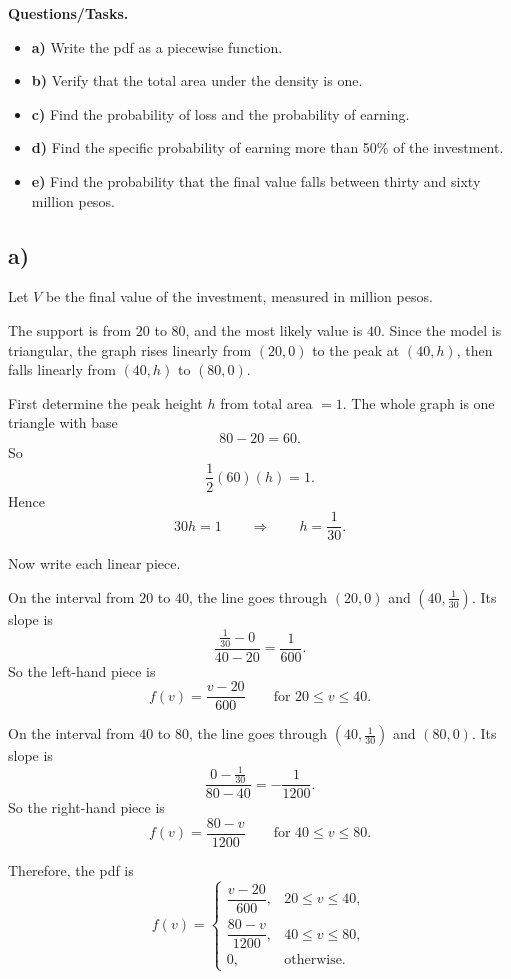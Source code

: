 \textbf{Questions/Tasks.}
\begin{itemize}
	\item \textbf{a)} Write the pdf as a piecewise function.
	\item \textbf{b)} Verify that the total area under the density is one.
	\item \textbf{c)} Find the probability of loss and the probability of earning.
	\item \textbf{d)} Find the specific probability of earning more than 50\% of the investment.
\item \textbf{e)} Find the probability that the final value falls between thirty and sixty million pesos.
\end{itemize}

\subsection*{a)}
Let $V$ be the final value of the investment, measured in million pesos.

The support is from $20$ to $80$, and the most likely value is $40$. Since the model is triangular, the graph rises linearly from $(20,0)$ to the peak at $(40,h)$, then falls linearly from $(40,h)$ to $(80,0)$.

First determine the peak height $h$ from total area $=1$. The whole graph is one triangle with base
\[
80-20=60.
\]
So
\[
\frac12(60)(h)=1.
\]
Hence
\[
30h=1
\qquad \Rightarrow \qquad
h=\frac{1}{30}.
\]

Now write each linear piece.

On the interval from $20$ to $40$, the line goes through $(20,0)$ and $(40,\tfrac{1}{30})$. Its slope is
\[
\frac{\tfrac{1}{30}-0}{40-20}=\frac{1}{600}.
\]
So the left-hand piece is
\[
f(v)=\frac{v-20}{600}\qquad \text{for }20\le v\le 40.
\]

On the interval from $40$ to $80$, the line goes through $(40,\tfrac{1}{30})$ and $(80,0)$. Its slope is
\[
\frac{0-\tfrac{1}{30}}{80-40}=-\frac{1}{1200}.
\]
So the right-hand piece is
\[
f(v)=\frac{80-v}{1200}\qquad \text{for }40\le v\le 80.
\]

Therefore, the pdf is
\[
f(v)=
\begin{cases}
	\dfrac{v-20}{600}, & 20\le v\le 40,\\[6pt]
	\dfrac{80-v}{1200}, & 40\le v\le 80,\\[6pt]
	0, & \text{otherwise.}
\end{cases}
\]

